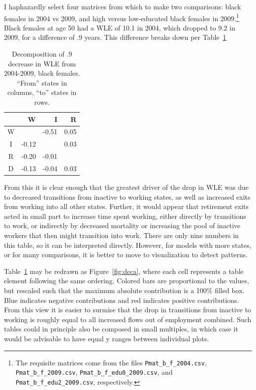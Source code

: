\documentclass{article}
\begin{document}
I haphazardly select four matrices from which to make two comparisons: black
females in 2004 vs 2009, and high versus low-educated black females in
2009.\footnote{The requisite matrices come from the files
\texttt{Pmat\_b\_f\_2004.csv}, \texttt{Pmat\_b\_f\_2009.csv}, \texttt{Pmat\_b\_f\_edu0\_2009.csv}, and
\texttt{Pmat\_b\_f\_edu2\_2009.csv}, respectively. } Black females at age 50 had
a WLE of 10.1 in 2004, which dropped to 9.2 in 2009, for a difference of .9
years. This difference breaks down per Table~\ref{tab:A}
\FloatBarrier
\begin{table}[ht]
\centering
\caption{Decomposition of .9 decrease in WLE from 2004-2009, black females.
``From'' states in columns, ``to'' states in rows.}
\label{tab:A}
\begin{tabular}{c|rrr}
 & W & I & R \\ 
  \hline
W &  & -0.51 & 0.05 \\ 
  I & -0.12 &  & 0.03 \\ 
  R & -0.20 & -0.01 &  \\ 
  D & -0.13 & -0.04 & 0.03 \\ 
   \hline
\end{tabular}
\end{table}

From this it is clear enough that the greatest driver of the drop in WLE was due
to decreased transitions from inactive to working states, as well as increased
exits from working into all other states. Further, it would appear that
retirement exits acted in small part to increase time spent working, either
directly by transitions to work, or indirectly by decreased mortality or increasing the pool
of inactive workers that then might transition into work. There are only nine
numbers in this table, so it can be interpreted directly. However, for models
with more states, or for many comparisons, it is better to move to visualization
to detect patterns. 

Table~\ref{tab:A} may be redrawn as Figure~\ref{fig:deca}, where each cell
represents a table element following the same ordering. Colored bars are
proportional to the values, but rescaled such that the maximum absolute
contribution is a 100\% filled box. Blue indicates negative contributions and
red indicates positive contributions. From this view it is easier to surmise
that the drop in transitions from inactive to working is roughly equal to all
increased flows out of employment combined. Such tables could in principle also
be composed in small multiples, in which case it would be advisable to have
equal y ranges between individual plots.
\end{document}
